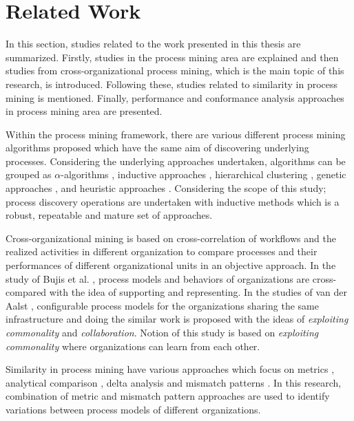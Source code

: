 \section{Related Work}
\label{sec:relatedwork}

In this section, studies related to the work presented in this thesis are summarized. Firstly, studies in the process mining area are explained and then studies from cross-organizational process mining, which is the main topic of this research, is introduced. Following these, studies related to similarity in process mining is mentioned. Finally, performance and conformance analysis approaches in process mining area are presented.

Within the process mining framework, there are various different process mining algorithms proposed which have the same aim of discovering underlying processes. Considering the underlying approaches undertaken, algorithms can be grouped as $\alpha$-algorithms \cite{van2004workflow,de2004process}, inductive approaches \cite{herbst1998integrating,herbst2000dealing}, hierarchical clustering \cite{greco2005mining}, genetic approaches \cite{van2005genetic,esgin2010hybrid}, and heuristic approaches \cite{esgin2009hybrid}. Considering the scope of this study; process discovery operations are undertaken with inductive methods which is a robust, repeatable and mature set of approaches.

Cross-organizational mining is based on cross-correlation of workflows and the realized activities in different organization to compare processes and their performances of different organizational units in an objective approach. In the study of Bujis et al. \cite{buijs2012towards}, process models and behaviors of organizations are cross-compared with the idea of supporting and representing. In the studies of van der Aalst \cite{van2011business,van2011intra}, configurable process models for the organizations sharing the same infrastructure and doing the similar work is proposed with the ideas of \textit{exploiting commonality} and \textit{collaboration}. Notion of this study is based on \textit{exploiting commonality} where organizations can learn from each other.

Similarity in process mining have various approaches which focus on metrics \cite{dijkman2011similarity}, analytical comparison \cite{buijs2014comparing}, delta analysis \cite{esgin2011delta,esgin2013sequence} and mismatch patterns \cite{dijkman2007mismatch}. In this research, combination of metric and mismatch pattern approaches are used to identify variations between process models of different organizations.